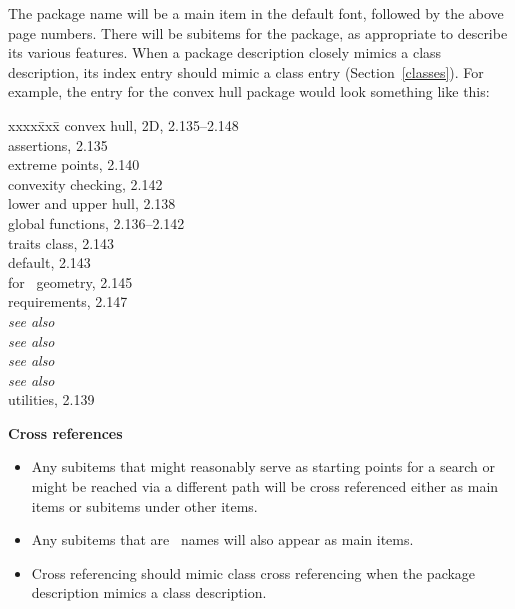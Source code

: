 \documentclass[11pt]{article}
\newenvironment{indexex}{\begin{tabbing}
xxxx\=xxx\=\kill}{\end{tabbing}}
\begin{document}
\begin{description}
        The package name will be a main item in the default font, followed 
        by the above page numbers.  There will be subitems for the package, 
        as appropriate
        to describe its various features.  When a package
        description closely mimics a class description, its index entry 
        should mimic a class entry (Section~\ref{classes}).  For example,
        the entry for the convex hull package would look something like
        this:
        \begin{indexex}
         convex hull, 2D,                                        2.135--2.148 \\
       \> assertions,                                            2.135  \\
       \> extreme points,                                        2.140  \\
       \> convexity checking,                                    2.142  \\
       \> lower and upper hull,                                  2.138  \\
       \> global functions,                                      2.136--2.142 \\
       \> traits class,                                          2.143  \\
       \>\> default,                                          2.143  \\
       \>\> for \leda\ geometry,                       2.145  \\
       \>\> requirements,                                    2.147  \\
          \>\> {\em see also} \\
          \>\> {\em see also} \\
          \>\> {\em see also} \\
          \>\> {\em see also} \\
       \> utilities,                                             2.139 \\
        \end{indexex}

   \item{\bf Cross references}

        \begin{itemize}
           \item Any subitems that might reasonably serve as starting points 
                 for a search or might be reached via a different path will
                 be cross referenced either as main items or subitems under
                 other items.
           \item Any subitems that are \CC\ names will also appear as main
                 items.
           \item Cross referencing should mimic class cross referencing
                 when the package description mimics a class description.
        \end{itemize}


\end{description}
\end{document}
